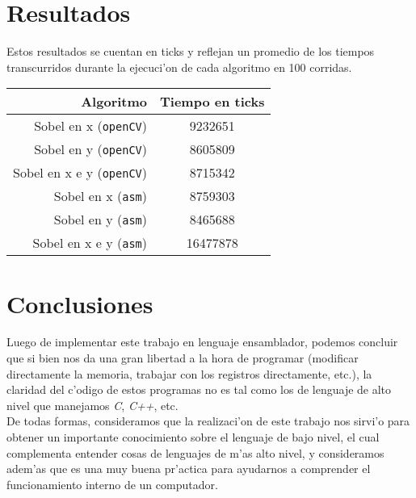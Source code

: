 \documentclass[11pt]{article}
\begin{document}
\newpage
\section{Resultados}
Estos resultados se cuentan en ticks y reflejan un promedio de los tiempos transcurridos durante la ejecuci'on de cada algoritmo en 100 corridas.
\begin{center}
 \begin{tabular}{| r | c |}
\hline
Algoritmo	&	Tiempo en ticks \\
\hline
Sobel en x (\verb'openCV')	&	9232651\\
Sobel en y (\verb'openCV')	&	8605809\\
Sobel en x e y (\verb'openCV')	&	8715342\\
\hline
Sobel en x (\verb'asm')	&	8759303\\
Sobel en y (\verb'asm')	&	8465688\\
Sobel en x e y (\verb'asm')	&	16477878\\
\hline
\end{tabular}
\end{center}
\section{Conclusiones}
Luego de implementar este trabajo en lenguaje ensamblador, podemos concluir que si bien nos da una gran libertad a la hora de programar (modificar directamente la memoria, trabajar con los registros directamente, etc.), la claridad del c'odigo de estos programas no es tal como los de lenguaje de alto nivel que manejamos \textit{C}, \textit{C++}, etc. \\
De todas formas, consideramos que la realizaci'on de este trabajo nos sirvi'o para obtener un importante conocimiento sobre el lenguaje de bajo nivel, el cual complementa entender cosas de lenguajes de m'as alto nivel, y consideramos adem'as que es una muy buena pr'actica para ayudarnos a comprender el funcionamiento interno de un computador.
\end{document}
